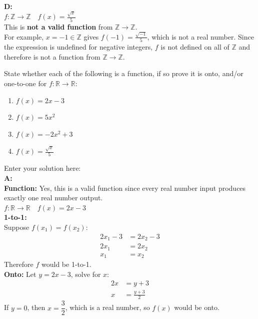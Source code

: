 \documentclass[10pt]{exam}
\begin{document}
\begin{questions}
\begin{solution}
    \textbf{D:}\\
    $f: \mathbb{Z} \rightarrow \mathbb{Z} \quad f(x) = \frac{\sqrt{x}}{5}$\\
    This is \textbf{not a valid function} from $\mathbb{Z} \to \mathbb{Z}$.\\
    For example, $x = -1 \in \mathbb{Z}$ gives $f(-1) = \frac{\sqrt{-1}}{5}$, which is not a real number. Since the expression is undefined for negative integers, $f$ is not defined on all of $\mathbb{Z}$ and therefore is not a function from $\mathbb{Z} \to \mathbb{Z}$.
\end{solution}

\question[20] State whether each of the following is a function, if so prove it is onto, and/or one-to-one for $f: \mathbb{R} \rightarrow \mathbb{R}$:
\begin{enumerate} [label=(\alph*)]
    \item $f(x) = 2x - 3$
    \item $f(x) = 5x^2$
    \item $f(x) = -2x^2+3$
    \item $f(x) = \frac{\sqrt{x}}{5}$
\end{enumerate}

\begin{solution}
    Enter your solution here: \\
    \textbf{A:}\\
    \textbf{Function:} Yes, this is a valid function since every real number input produces exactly one real number output.\\
    $f: \mathbb{R} \rightarrow \mathbb{R} \quad f(x) = 2x - 3$\\
    \textbf{1-to-1:}\\
    Suppose $f(x_1) = f(x_2)$:
    \begin{align*}
    2x_1 - 3 &= 2x_2 - 3 \\
    2x_1 &= 2x_2 \\
    x_1 &= x_2
    \end{align*}
    Therefore $f$ would be 1-to-1.\\
    \textbf{Onto:}
    Let $y = 2x - 3$, solve for $x$:
    \begin{align*}
    2x &= y + 3 \\
    x &= \frac{y + 3}{2}
    \end{align*}
    If $y = 0$, then $x = \dfrac{3}{2}$, which is a real number, so $f(x)$ would be onto.\\
    

\end{solution}
\end{questions}
\end{document}
